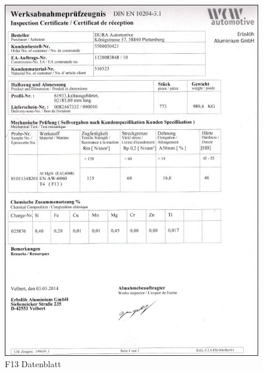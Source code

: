 \documentclass[12pt,a4paper,parskip]{scrartcl}
\begin{document}
\maketitle
\begin{figure}[hbtp]
\centering
\includegraphics[width=.8\textwidth]{F13Datenblatt.jpg}
\caption{F13 Datenblatt}
\end{figure}
\end{document}
